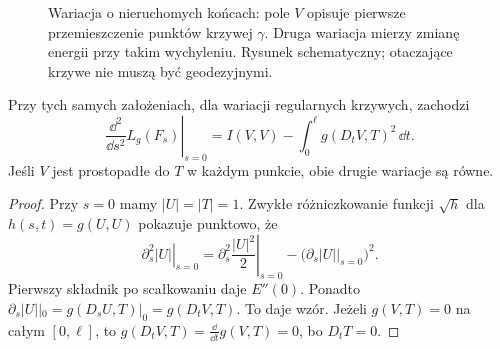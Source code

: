 \begin{figure}[htbp]
\centering
{}
\caption{Wariacja o nieruchomych końcach: pole $V$ opisuje pierwsze przemieszczenie punktów krzywej $\gamma$. Druga wariacja mierzy zmianę energii przy takim wychyleniu. Rysunek schematyczny; otaczające krzywe nie muszą być geodezyjnymi.}
\label{fig:druga-wariacja-krzywej}
\end{figure}

\begin{stwierdzenie}
\label{prop:druga-wariacja-dlugosci}
Przy tych samych założeniach, dla wariacji
regularnych krzywych, zachodzi
\begin{equation}\label{eq:druga-wariacja-dlugosci}
 \left.\frac{\dd^2}{\dd s^2}L_g(F_s)\right|_{s=0}
 = I(V,V)-\int_0^\ell
      g(D_tV,T)^2\,\dd t.
\end{equation}
Jeśli $V$ jest prostopadłe do $T$ w każdym
punkcie, obie drugie wariacje są równe.
\end{stwierdzenie}
\begin{proof}
Przy $s=0$ mamy $|U|=|T|=1$. Zwykłe
różniczkowanie funkcji $\sqrt{h}$ dla
$h(s,t)=g(U,U)$ pokazuje punktowo, że
\[
 \left.\partial_s^2|U|\right|_{s=0}
 =\left.\partial_s^2\frac{|U|^2}{2}\right|_{s=0}
   -\bigl(\left.\partial_s|U|\right|_{s=0}\bigr)^2.
\]
Pierwszy składnik po scałkowaniu daje $E''(0)$.
Ponadto $\partial_s|U||_0=g(D_sU,T)|_0
=g(D_tV,T)$. To daje wzór. Jeżeli
$g(V,T)=0$ na całym $[0,\ell]$, to
$g(D_tV,T)=\frac{\dd}{\dd t}g(V,T)=0$,
bo $D_tT=0$.
\end{proof}

